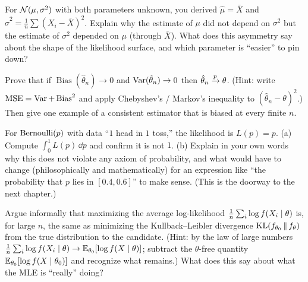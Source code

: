 \begin{exercise}
\label{ch30:exc-two-param}
For $\mathcal{N}(\mu,\sigma^2)$ with both parameters unknown, you derived
$\hat\mu=\bar X$ and $\hat\sigma^2=\frac1n\sum(X_i-\bar X)^2$. Explain why the
estimate of $\mu$ did not depend on $\sigma^2$ but the estimate of $\sigma^2$
depended on $\mu$ (through $\bar X$). What does this asymmetry say about the
shape of the likelihood surface, and which parameter is ``easier'' to pin down?
\end{exercise}

\begin{exercise}
\label{ch30:exc-consistency}
Prove that if $\operatorname{Bias}(\hat\theta_n)\to 0$ and
$\operatorname{Var}(\hat\theta_n)\to 0$ then $\hat\theta_n \xrightarrow{p} \theta$. (Hint: write
$\mathrm{MSE}=\operatorname{Var}+\operatorname{Bias}^2$ and apply Chebyshev's / Markov's
inequality to $(\hat\theta_n-\theta)^2$.) Then give one example of a consistent
estimator that is biased at every finite $n$.
\end{exercise}

\begin{exercise}
\label{ch30:exc-not-prob}
For $\operatorname{Bernoulli}(p)$ with data ``$1$ head in $1$ toss,'' the likelihood is $L(p)=p$.
(a) Compute $\int_0^1 L(p)\,\dd p$ and confirm it is not $1$.
(b) Explain in your own words why this does not violate any axiom of probability,
and what would have to change (philosophically and mathematically) for an
expression like ``the probability that $p$ lies in $[0.4,0.6]$'' to make sense.
(This is the doorway to the next chapter.)
\end{exercise}

\begin{exercise}
\label{ch30:exc-kl}
Argue informally that maximizing the average log-likelihood
$\frac1n\sum_i \log f(X_i\mid\theta)$ is, for large $n$, the same as minimizing
the Kullback--Leibler divergence $\operatorname{KL}(f_{\theta_0}\,\|\,f_\theta)$ from the true
distribution to the candidate. (Hint: by the law of large numbers
$\frac1n\sum_i\log f(X_i\mid\theta)\to \operatorname{\mathbb{E}}_{\theta_0}[\log f(X\mid\theta)]$;
subtract the $\theta$-free quantity $\operatorname{\mathbb{E}}_{\theta_0}[\log f(X\mid\theta_0)]$ and
recognize what remains.) What does this say about what the MLE is ``really''
doing?
\end{exercise}
